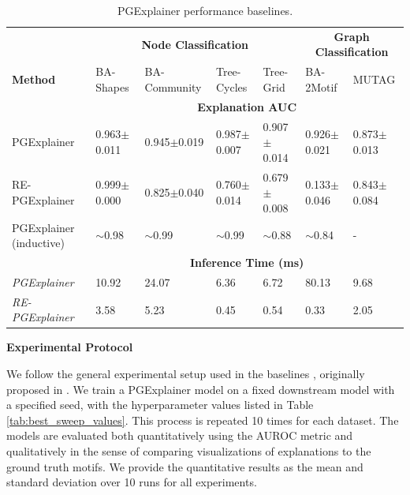 \begin{table}[ht]
    \centering
    \scriptsize
    \begin{tabularx}{\textwidth}{lXXXX|XX}   %
    \textbf{} & \multicolumn{4}{c}{\textbf{Node Classification}} & \multicolumn{2}{c}{\textbf{Graph Classification}} \\
    \textbf{Method} & BA-Shapes & BA-Community & Tree-Cycles & Tree-Grid & BA-2Motif & MUTAG \\
    \midrule
    \addlinespace
    \textbf{} & \multicolumn{6}{c}{\textbf{Explanation AUC}} \\
    \midrule
    PGExplainer & 0.963$\pm$0.011 & 0.945$\pm$0.019 & 0.987$\pm$0.007 & 0.907$\pm$0.014 & 0.926$\pm$0.021 & 0.873$\pm$0.013 \\
    \midrule
    RE-PGExplainer & 0.999$\pm$0.000 & 0.825$\pm$0.040 & 0.760$\pm$0.014 & 0.679$\pm$0.008 & 0.133$\pm$0.046 & 0.843$\pm$0.084 \\
    \midrule
    PGExplainer (inductive) & $\sim$0.98 & $\sim$0.99 & $\sim$0.99 & $\sim$0.88 & $\sim$0.84 & - \\
    \midrule
    \addlinespace
    \textbf{} & \multicolumn{6}{c}{\textbf{Inference Time (ms)}} \\
    \midrule
    \textit{PGExplainer} & 10.92 & 24.07 & 6.36 & 6.72 & 80.13 & 9.68 \\
    \textit{RE-PGExplainer} & 3.58 & 5.23 & 0.45 & 0.54 & 0.33 & 2.05 \\
    \bottomrule
    \end{tabularx}
    \caption[Baseline PGExplainer and RE-PGExplainer]{PGExplainer performance baselines.}
    \label{tab:pgexplainer_baseline}
\end{table}


\textbf{Experimental Protocol}\par
We follow the general experimental setup used in the baselines \cite{luo2020parameterized} \cite{holdijk2021re}, originally proposed in \cite{ying2019gnnexplainer}. We train a PGExplainer model on a fixed downstream model with a specified seed, with the hyperparameter values listed in Table \ref{tab:best_sweep_values}. This process is repeated 10 times for each dataset. The models are evaluated both quantitatively using the AUROC metric and qualitatively in the sense of comparing visualizations of explanations to the ground truth motifs. We provide the quantitative results as the mean and standard deviation over 10 runs for all experiments. \bigskip


